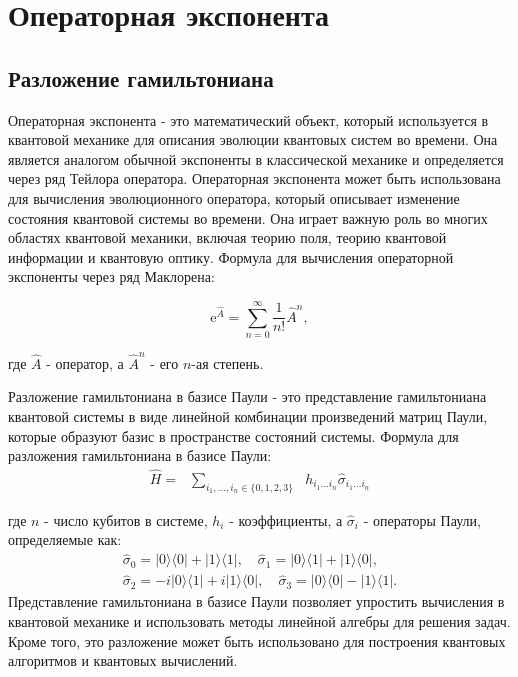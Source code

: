 \documentclass[a4paper]{report}
\begin{document}

\chapter{Операторная экспонента}


\section{Разложение гамильтониана}
Операторная экспонента - это математический объект, который используется в квантовой механике для описания эволюции квантовых систем во времени. Она является аналогом обычной экспоненты в классической механике и определяется через ряд Тейлора оператора. Операторная экспонента может быть использована для вычисления эволюционного оператора, который описывает изменение состояния квантовой системы во времени. Она играет важную роль во многих областях квантовой механики, включая теорию поля, теорию квантовой информации и квантовую оптику. Формула для вычисления операторной экспоненты через ряд Маклорена:

$$\text{e}^{\hat{A}} = \sum_{n=0}^{\infty} \frac{1}{n!} \hat{A}^n,$$

\noindent где $\hat{A}$ - оператор, а $\hat{A}^n$ - его $n$-ая степень.

Разложение гамильтониана в базисе Паули - это представление гамильтониана квантовой системы в виде линейной комбинации произведений матриц Паули, которые образуют базис в пространстве состояний системы. Формула для разложения гамильтониана в базисе Паули:
$$
    \begin{matrix}
        \hat{H}= & \sum\limits_{i_1,\ldots,i_n\in\{0,1,2,3\}} & h_{i_1\ldots i_n}\hat{\sigma}_{i_1\ldots i_n}
    \end{matrix}
$$

\noindent где $n$ - число кубитов в системе, $h_i$ - коэффициенты, а $\hat{\sigma}_i$ - операторы Паули, определяемые как:
$$\begin{array}{cc}
        \hat{\sigma}_0 = |0\rangle\langle0| + |1\rangle\langle1|, \quad \hat{\sigma}_1 = |0\rangle\langle1| + |1\rangle\langle0|,    \\
        \hat{\sigma}_2 = -i|0\rangle\langle1| + i|1\rangle\langle0|, \quad \hat{\sigma}_3 = |0\rangle\langle0| - |1\rangle\langle1|.
    \end{array}$$
\noindent Представление гамильтониана в базисе Паули позволяет упростить вычисления в квантовой механике и использовать методы линейной алгебры для решения задач. Кроме того, это разложение может быть использовано для построения квантовых алгоритмов и квантовых вычислений.
\end{document}
